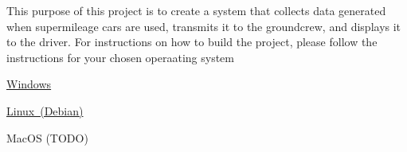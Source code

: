 This purpose of this project is to create a system that collects data generated when supermileage cars are used, transmits it to the groundcrew, and displays it to the driver. For instructions on how to build the project, please follow the instructions for your chosen operaating system
\begin{DoxyItemize}
\item \mbox{\hyperlink{md_Instructions_WindowsSetup}{Windows}}
\item \mbox{\hyperlink{md_Instructions_LinuxSetup}{Linux (Debian)}}
\item Mac\+OS (TODO) 
\end{DoxyItemize}